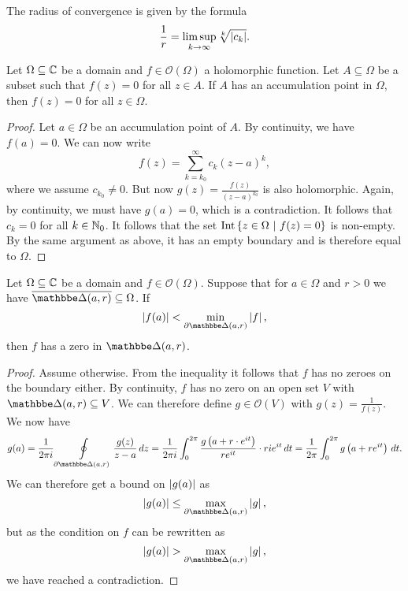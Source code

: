 \begin{opomba}
The radius of convergence is given by the formula
\[
\frac{1}{r} = \limsup_{k \to \infty} \sqrt[k]{\left\lvert c_k\right\rvert}.
\]
\end{opomba}

\begin{izrek}[Identity]
Let $\Omega \subseteq \mathbb{C}$ be a domain and
$f \in \mathcal{O}(\Omega)$ a holomorphic function. Let
$A \subseteq \Omega$ be a subset such that $f(z) = 0$ for all
$z \in A$. If $A$ has an accumulation point in $\Omega$, then
$f(z) = 0$ for all $z \in \Omega$.
\end{izrek}

\begin{proof}
Let $a \in \Omega$ be an accumulation point of $A$. By continuity,
we have $f(a) = 0$. We can now write
\[
f(z) = \sum_{k=k_0}^\infty c_k (z - a)^k,
\]
where we assume $c_{k_0} \ne 0$. But now
$g(z) = \frac{f(z)}{(z-a)^{k_0}}$ is also holomorphic. Again, by
continuity, we must have $g(a) = 0$, which is a contradiction. It
follows that $c_k = 0$ for all $k \in \mathbb{N}_0$. It follows that the
set $\operatorname{Int} \left\{z \in \Omega~\middle\vert~f(z) = 0\right\}$ is non-empty. By the same
argument as above, it has an empty boundary and is therefore equal
to $\Omega$.
\end{proof}


\begin{lema}\label{hol:lm:root}
Let $\Omega \subseteq \mathbb{C}$ be a domain and
$f \in \mathcal{O}(\Omega)$. Suppose that for $a \in \Omega$ and
$r > 0$ we have $\oline{\dsk(a, r)} \subseteq \Omega$. If
\[
\abs{f(a)} < \min_{\partial \dsk(a, r)} \abs{f},
\]
then $f$ has a zero in $\dsk(a, r)$.
\end{lema}

\begin{proof}
Assume otherwise. From the inequality it follows that $f$ has no
zeroes on the boundary either. By continuity, $f$ has no zero on an
open set $V$ with $\dsk(a, r) \subseteq V$. We can therefore define
$g \in \mathcal{O}(V)$ with $g(z) = \frac{1}{f(z)}$. We now have
\[
g(a) =
\frac{1}{2 \pi i}
\olint_{\partial \dsk(a, r)} \frac{g(z)}{z-a}\,dz =
\frac{1}{2 \pi i}
\int_0^{2 \pi}
\frac{g \br{a + r \cdot e^{it}}}{re^{it}} \cdot r i e^{it}\,dt =
\frac{1}{2 \pi} \int_0^{2 \pi}  g \br{a + r e^{it}}\,dt.
\]
We can therefore get a bound on $\left\lvert g(a)\right\rvert$ as
\[
\abs{g(a)} \leq \max_{\partial \dsk(a, r)} \abs{g},
\]
but as the condition on $f$ can be rewritten as
\[
\abs{g(a)} > \max_{\partial \dsk(a, r)} \abs{g},
\]
we have reached a contradiction.
\end{proof}

